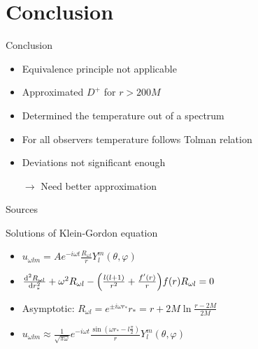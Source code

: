 \documentclass{beamer}
\begin{document}
\section{Conclusion}
\begin{frame}{Conclusion}
\begin{itemize}
	\item Equivalence principle not applicable
	\item Approximated \(D^+\) for \(r > 200M\)
	\item Determined the temperature out of a spectrum
	\item For all observers temperature follows Tolman relation
	\item Deviations not significant enough
	\item[\(\to\)] Need better approximation
\end{itemize}
\end{frame}

\begin{frame}{Sources}
\printbibliography
\end{frame}

\begin{frame}
\maketitle
\end{frame}

\begin{frame}{Solutions of Klein-Gordon equation \cite{davies}}
\begin{itemize}
	\item \(u_{\omega l m} = A e^{-i\omega t} \frac{R_{\omega l}}{r}Y_l^m (\theta, \varphi)\)
	\item[]
	\item \(\dv[2]{R_{\omega l}}{r_*} + \omega^2 R_{\omega l} -\qty(\frac{l(l+1)}{r^2} + \frac{f'(r)}{r})f(r) R_{\omega l} = 0\)
	\item[]
	\item Asymptotic: \(R_{\omega l} = e^{\pm i\omega r_*}\)\hspace{3cm}\(r_* = r + 2M \ln \frac{r-2M}{2M}\)
	\item[]	
	\item \(u_{\omega l m} \approx \frac{1}{\sqrt{\pi\omega}} e^{-i\omega t} \frac{\sin(\omega r_* - l\frac{\pi}{2})}{r} Y_l^m (\theta, \varphi)\) 
\end{itemize}
\end{frame}
\end{document}
